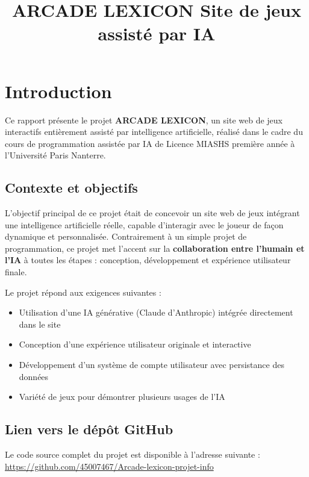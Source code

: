 \documentclass[a4paper, 12pt, twoside]{article}
\title{ARCADE LEXICON  Site de jeux assisté par IA}
\begin{document}
\pagedegarde

\tableofcontents
\newpage

\section{Introduction}

Ce rapport présente le projet \textbf{ARCADE LEXICON}, un site web de jeux interactifs entièrement assisté par intelligence artificielle, réalisé dans le cadre du cours de programmation assistée par IA de Licence MIASHS première année à l'Université Paris Nanterre.

\subsection{Contexte et objectifs}

L'objectif principal de ce projet était de concevoir un site web de jeux intégrant une intelligence artificielle réelle, capable d'interagir avec le joueur de façon dynamique et personnalisée. Contrairement à un simple projet de programmation, ce projet met l'accent sur la \textbf{collaboration entre l'humain et l'IA} à toutes les étapes : conception, développement et expérience utilisateur finale.

Le projet répond aux exigences suivantes :
\begin{itemize}
  \item Utilisation d'une IA générative (Claude d'Anthropic) intégrée directement dans le site
  \item Conception d'une expérience utilisateur originale et interactive
  \item Développement d'un système de compte utilisateur avec persistance des données
  \item Variété de jeux pour démontrer plusieurs usages de l'IA
\end{itemize}

\subsection{Lien vers le dépôt GitHub}

Le code source complet du projet est disponible à l'adresse suivante :\\
\url{https://github.com/45007467/Arcade-lexicon-projet-info}

\newpage

\end{document}
